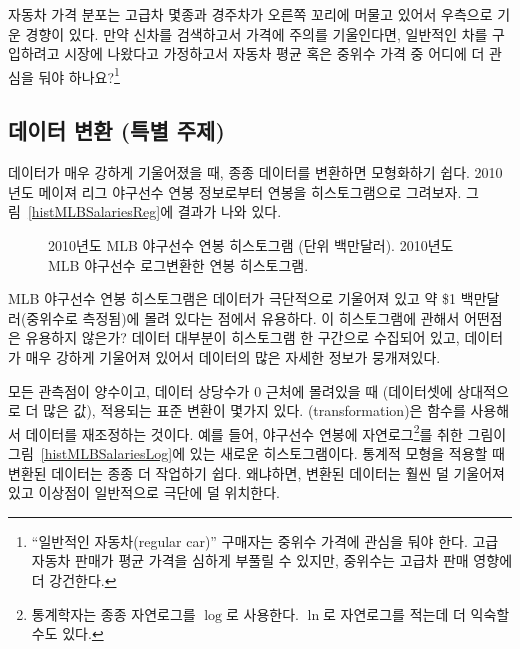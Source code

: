 \begin{exercise}
자동차 가격 분포는 고급차 몇종과 경주차가 오른쪽 꼬리에 머물고 있어서 우측으로 기운 경향이 있다. 
만약 신차를 검색하고서 가격에 주의를 기울인다면, 일반적인 차를 구입하려고 시장에 나왔다고 가정하고서 자동차 평균 혹은 중위수 가격 중 어디에 더 관심을 둬야 하나요?\footnote{``일반적인 자동차(regular car)'' 구매자는 중위수 가격에 관심을 둬야 한다.
고급 자동차 판매가 평균 가격을 심하게 부풀릴 수 있지만, 중위수는 고급차 판매 영향에 더 강건한다.}
\end{exercise}

\subsection{데이터 변환 (특별 주제)}
\label{transformingDataSubsection}

데이터가 매우 강하게 기울어졌을 때, 종종 데이터를 변환하면 모형화하기 쉽다.
2010년도 메이져 리그 야구선수 연봉 정보로부터 연봉을 히스토그램으로 그려보자.
그림~\ref{histMLBSalariesReg}에 결과가 나와 있다.

\begin{figure}[ht]
\centering
{}
\caption{ 2010년도 MLB 야구선수 연봉 히스토그램 (단위 백만달러). 
2010년도 MLB 야구선수 로그변환한 연봉 히스토그램.}
\label{histMLBSalaries}
\end{figure}

\begin{example}{
MLB 야구선수 연봉 히스토그램은 데이터가 극단적으로 기울어져 있고 약 \$1 백만달러(중위수로 측정됨)에 몰려 있다는 점에서 유용하다. 이 히스토그램에 관해서 어떤점은 유용하지 않은가?}
데이터 대부분이 히스토그램 한 구간으로 수집되어 있고, 데이터가 매우 강하게 기울어져 있어서 데이터의 많은 자세한 정보가 뭉개져있다.
\end{example}

모든 관측점이 양수이고, 데이터 상당수가 0 근처에 몰려있을 때 (데이터셋에 상대적으로 더 많은 값), 적용되는 표준 변환이 몇가지 있다. (transformation)은 함수를 사용해서 데이터를 재조정하는 것이다.
예를 들어, 야구선수 연봉에 자연로그\footnote{통계학자는 종종 자연로그를 $\log$로 사용한다. $\ln$로 자연로그를 적는데 더 익숙할 수도 있다.}를 취한 그림이 그림~\ref{histMLBSalariesLog}에 있는 새로운 히스토그램이다.
통계적 모형을 적용할 때 변환된 데이터는 종종 더 작업하기 쉽다. 왜냐하면, 변환된 데이터는 훨씬 덜 기울어져 있고 이상점이 일반적으로 극단에 덜 위치한다.

